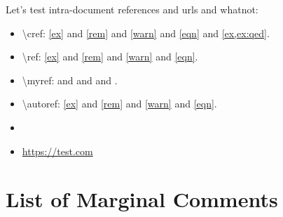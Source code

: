 \documentclass{article}
\numberwithin{thm}{section}
\numberwithin{prob}{section}
\numberwithin{equation}{section}
\begin{document}
Let's test intra-document references and urls and whatnot: 

\begin{itemize}
    \item \textbackslash cref: \cref{ex} and \cref{rem} and \cref{warn} and \cref{eqn} and \cref{ex,ex:qed}.
    \item \textbackslash ref: \ref{ex} and \ref{rem} and \ref{warn} and \ref{eqn}. 
    \item \textbackslash myref:  and  and  and .
    \item \textbackslash autoref: \autoref{ex} and \autoref{rem} and \autoref{warn} and \autoref{eqn}.
    \item \cite[Test]{conrad-min}
    \item \url{https://test.com}
\end{itemize}




\newpage
\section{List of Marginal Comments}
\listoftodos[]
\printindex
\end{document}

